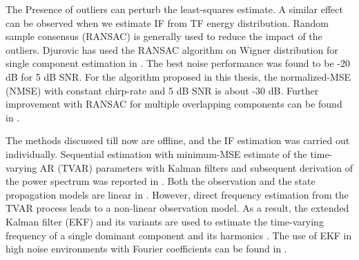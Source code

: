 The Presence of outliers can perturb the least-squares estimate. A similar effect can be observed when we estimate IF from TF energy distribution. Random sample consensus (RANSAC) is generally used to reduce the impact of the outliers. Djurovic has used the RANSAC algorithm on Wigner distribution for single component estimation in \cite{djurovic2016wd}. The best noise performance was found to be -20 dB for 5 dB SNR. For the algorithm proposed in this thesis, the normalized-MSE (NMSE) with constant chirp-rate and 5 dB SNR is about -30 dB. Further improvement with RANSAC for multiple overlapping components can be found in \cite{djurovic2018qml}. 

The methods discussed till now are offline, and the IF estimation was carried out individually. Sequential estimation with minimum-MSE estimate of the time-varying AR (TVAR) parameters with Kalman filters and subsequent derivation of the power spectrum was reported in \cite{Aboy2005, khan2007expectation}. Both the observation and the state propagation models are linear in \cite{Aboy2005, khan2007expectation}. However, direct frequency estimation from the TVAR process leads to a non-linear observation model. As a result, the extended Kalman filter (EKF) \cite{Routray2002} and its variants are used to estimate the time-varying frequency of a single dominant component \cite{Routray2002} and its harmonics \cite{Chen2010}. The use of EKF in high noise environments with Fourier coefficients can be found in \cite{LaScala1996}. 

